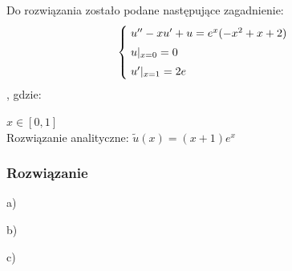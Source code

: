 Do rozwiązania zostało podane następujące zagadnienie:
\[
\begin{cases}
\vspace{0.1cm} 
\hspace{0,1cm}u''-xu' + u=e^x(-x^2+x+2) \\
\vspace{0.1cm}
\hspace{0,1cm}u|_{x=0}=0 \\
\hspace{0,1cm}u'|_{x=1}=2e
\end{cases}
\]
, gdzie:

$x\in [0,1]$
\\
Rozwiązanie analityczne: $\widetilde{u}(x) = (x+1)e^x$

\subsubsection{Rozwiązanie}


\begin{samepage}
a)

\end{samepage}
\newpage
\begin{samepage}
b)

\end{samepage}
\newpage
\begin{samepage}
c)

\end{samepage}